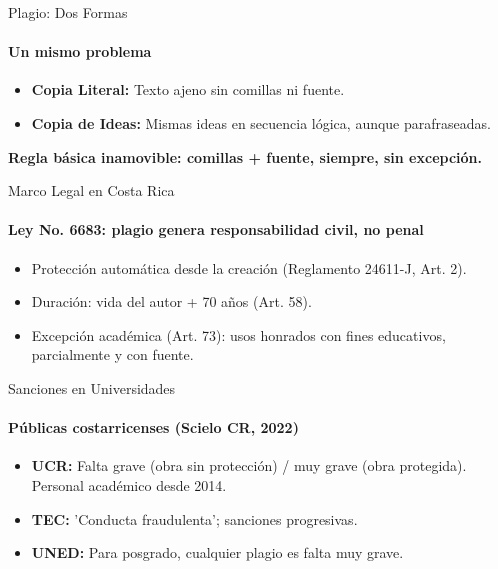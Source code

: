 \documentclass[aspectratio=169, 12pt]{beamer}
\begin{document}
\begin{frame}{Plagio: Dos Formas}
  \framesubtitle{Un mismo problema}
  \vspace{-2pt}

  \begin{itemize}
    \item {\bfseries Copia Literal:} Texto ajeno sin comillas ni fuente.
    \item {\bfseries Copia de Ideas:} Mismas ideas en secuencia lógica, aunque parafraseadas.
  \end{itemize}

  \vspace{0.5cm}
  {\color{Ember}\sffamily\bfseries Regla básica inamovible: comillas + fuente, siempre, sin excepción.}
\end{frame}

\begin{frame}{Marco Legal en Costa Rica}
  \framesubtitle{Ley No. 6683: plagio genera responsabilidad civil, no penal}
  \vspace{-2pt}

  \begin{itemize}
    \item Protección automática desde la creación (Reglamento 24611-J, Art. 2).
    \item Duración: vida del autor + 70 años (Art. 58).
    \item Excepción académica (Art. 73): usos honrados con fines educativos, parcialmente y con fuente.
  \end{itemize}
\end{frame}

\begin{frame}{Sanciones en Universidades}
  \framesubtitle{Públicas costarricenses (Scielo CR, 2022)}
  \vspace{-2pt}

  \begin{itemize}
    \item {\bfseries UCR:} Falta grave (obra sin protección) / muy grave (obra protegida). Personal académico desde 2014.
    \item {\bfseries TEC:} 'Conducta fraudulenta'; sanciones progresivas.
    \item {\bfseries UNED:} Para posgrado, cualquier plagio es falta muy grave.
  \end{itemize}
\end{frame}
\end{document}
